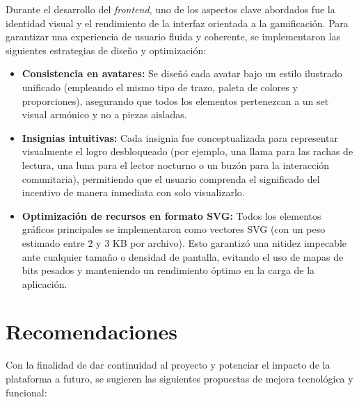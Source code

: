 \documentclass[12pt, atypical, journal]{article}
\begin{document}
Durante el desarrollo del \textit{frontend}, uno de los aspectos clave abordados fue la identidad visual y el rendimiento de la interfaz orientada a la gamificación. Para garantizar una experiencia de usuario fluida y coherente, se implementaron las siguientes estrategias de diseño y optimización:

\begin{itemize}
	\item \textbf{Consistencia en avatares:} Se diseñó cada avatar bajo un estilo ilustrado unificado (empleando el mismo tipo de trazo, paleta de colores y proporciones), asegurando que todos los elementos pertenezcan a un set visual armónico y no a piezas aisladas.
	\item \textbf{Insignias intuitivas:} Cada insignia fue conceptualizada para representar visualmente el logro desbloqueado (por ejemplo, una llama para las rachas de lectura, una luna para el lector nocturno o un buzón para la interacción comunitaria), permitiendo que el usuario comprenda el significado del incentivo de manera inmediata con solo visualizarlo.
	\item \textbf{Optimización de recursos en formato SVG:} Todos los elementos gráficos principales se implementaron como vectores SVG (con un peso estimado entre $2$ y $3$ KB por archivo). Esto garantizó una nitidez impecable ante cualquier tamaño o densidad de pantalla, evitando el uso de mapas de bits pesados y manteniendo un rendimiento óptimo en la carga de la aplicación.
	\end{itemize}

\newpage

\section{Recomendaciones}
Con la finalidad de dar continuidad al proyecto y potenciar el impacto de la plataforma a futuro, se sugieren las siguientes propuestas de mejora tecnológica y funcional:
\end{document}
